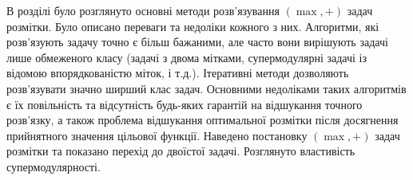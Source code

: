 \chapterConclusion

В розділі було розглянуто основні методи розв’язування $(\max ,+)$ задач розмітки.
Було описано переваги та недоліки кожного з них. Алгоритми, які розв'язують 
задачу точно є більш бажаними, але часто вони вирішують задачі лише обмеженого
класу (задачі з двома мітками, супермодулярні задачі із відомою впорядкованістю
міток, і т.д.). Ітеративні методи дозволяють розв'язувати значно ширший клас задач.
Основними недоліками таких алгоритмів є їх повільність та відсутність будь-яких
гарантій на відшукання точного розв'язку, а також проблема відшукання оптимальної
розмітки після досягнення прийнятного значення цільової функції. Наведено 
постановку $(\max,+)$ задач розмітки та показано перехід до двоїстої задачі.
Розглянуто властивість супермодулярності.